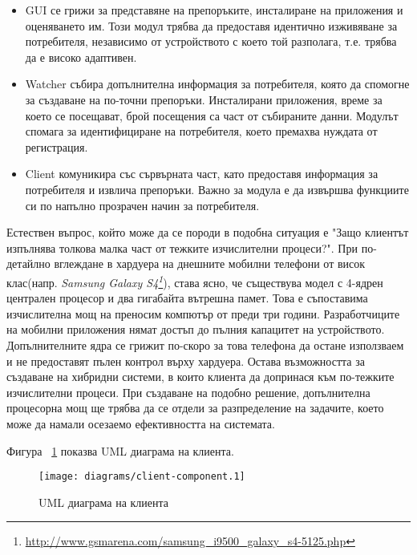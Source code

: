 \begin{itemize}
		\begin{itemize}
			\item GUI се грижи за представяне на препоръките, инсталиране на приложения и оценяването им. Този модул трябва да предоставя идентично изживяване за потребителя, независимо от устройството с което той разполага, т.е. трябва да е високо адаптивен.
			\item Watcher събира допълнителна информация за потребителя, която да спомогне за създаване на по-точни препоръки. Инсталирани приложения, време за което се посещават, брой посещения са част от събираните данни. Модулът спомага за идентифициране на потребителя, което премахва нуждата от регистрация.
			\item Client комуникира със сървърната част, като предоставя информация за потребителя и извлича препоръки. Важно за модула е да извършва функциите си по напълно прозрачен начин за потребителя.

		\end{itemize}
		
		Естествен въпрос, който може да се породи в подобна ситуация е "Защо клиентът изпълнява толкова малка част от тежките изчислителни процеси?".
		При по-детайлно вглеждане в хардуера на днешните мобилни телефони от висок клас(напр. \emph{Samsung Galaxy S4\footnote{\url{http://www.gsmarena.com/samsung_i9500_galaxy_s4-5125.php}}}), става ясно, че съществува модел с 4-ядрен централен процесор и два гигабайта вътрешна памет. Това е съпоставима изчислителна мощ на преносим компютър от преди три години. Разработчиците на мобилни приложения нямат достъп до пълния капацитет на устройството. Допълнителните ядра се грижит по-скоро за това телефона да остане използваем и не предоставят пълен контрол върху хардуера\cite{Gupta}.
		Остава възможността за създаване на хибридни системи, в които клиента да допринася към по-тежките изчислителни процеси. При създаване на подобно решение, допълнителна процесорна мощ ще трябва да се отдели за разпределение на задачите, което може да намали осезаемо ефективността на системата.
		
		Фигура ~\ref{figure:client-component} показва UML диаграма на клиента.
		
		\begin{figure}[htbp]
			\centering	
 			\texttt{[image: diagrams/client-component.1]}
			\caption{UML диаграма на клиента}
			\label{figure:client-component}
		\end{figure}
	\end{itemize}
	
